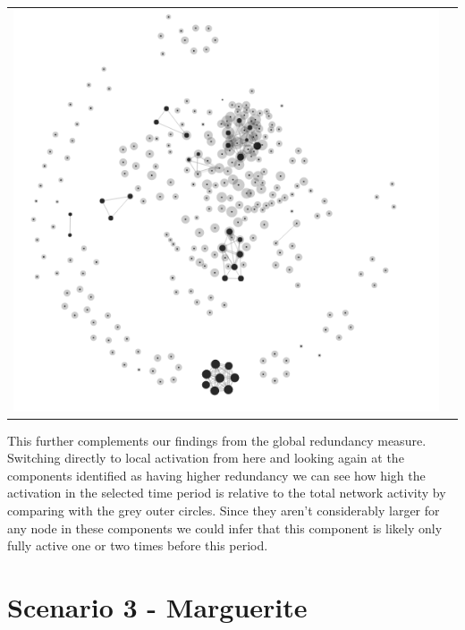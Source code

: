 \begin{center}
\begin{tabular}{cc}
\label{edgeTypes}
\includegraphics[trim={0 0 0 0}, width=140mm]{./Figures/TurinLocalActivation.png}
\end{tabular}
\end{center}
This further complements our findings from the global redundancy measure. Switching directly to local activation from here and looking again at the components identified as having higher redundancy we can see how high the activation in the selected time period is relative to the total network activity by comparing with the grey outer circles. Since they aren't considerably larger for any node in these components we could infer that this component is likely only fully active one or two times before this period.

\section{Scenario 3 - Marguerite} 

